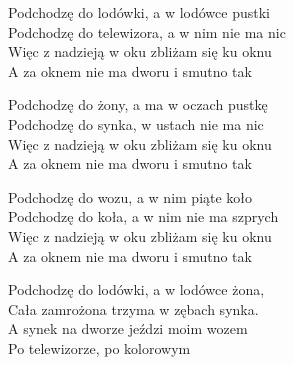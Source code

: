 \begin{text}
    Podchodzę do lodówki, a w lodówce pustki\\
    Podchodzę do telewizora, a w nim nie ma nic\\
    Więc z nadzieją w oku zbliżam się ku oknu\\
    A za oknem nie ma dworu i smutno tak

    Podchodzę do żony, a ma w oczach pustkę\\
    Podchodzę do synka, w ustach nie ma nic\\
    Więc z nadzieją w oku zbliżam się ku oknu\\
    A za oknem nie ma dworu i smutno tak

    Podchodzę do wozu, a w nim piąte koło\\
    Podchodzę do koła, a w nim nie ma szprych\\
    Więc z nadzieją w oku zbliżam się ku oknu\\
    A za oknem nie ma dworu i smutno tak

    Podchodzę do lodówki, a w lodówce żona,\\
    Cała zamrożona trzyma w zębach synka.\\
    A synek na dworze jeździ moim wozem\\
    Po telewizorze, po kolorowym
\end{text}
\begin{chord}

\end{chord}